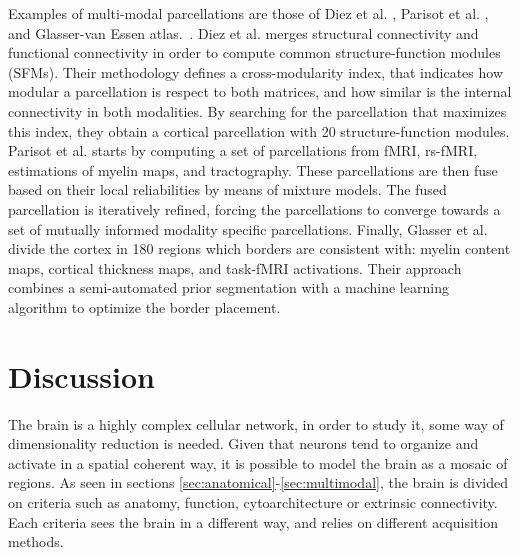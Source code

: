 Examples of multi-modal parcellations are those of Diez et al. \cite{Diez2014},
Parisot et al. \cite{Parisot2017}, and Glasser-van Essen atlas.~\cite{Glasser2016}. 
Diez et al. \cite{Diez2014} merges structural connectivity and functional
connectivity in order to compute common structure-function modules (SFMs).
Their methodology defines a cross-modularity index, that indicates how
modular a parcellation is respect to both matrices, and how similar is the
internal connectivity in both modalities. By searching for the parcellation
that maximizes this index, they obtain a cortical parcellation with 20 structure-function
modules. Parisot et al. \cite{Parisot2017} starts by computing a set of
parcellations from fMRI, rs-fMRI, estimations of myelin maps, and tractography.
These parcellations are then fuse based on their local reliabilities by means of
mixture models. The fused parcellation is iteratively refined, forcing 
the parcellations to converge towards a set of mutually informed modality specific
parcellations. Finally, Glasser et al.~\cite{Glasser2016}
divide the cortex in 180 regions which borders are consistent with: 
myelin content maps, cortical thickness maps, and task-fMRI activations. Their
approach combines a semi-automated prior segmentation with a machine learning
algorithm to optimize the border placement.

\section{Discussion}

The brain is a highly complex cellular network, in order to study it, some
way of dimensionality reduction is needed. Given that neurons tend to organize
and activate in a spatial coherent way, it is possible to model the brain as a
mosaic of regions. As seen in sections \ref{sec:anatomical}-\ref{sec:multimodal},
the brain is divided on criteria such as anatomy, function, cytoarchitecture or
extrinsic connectivity. Each criteria sees the brain in a different way, and
relies on different acquisition methods. 

